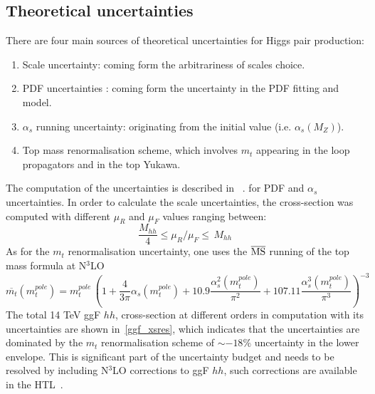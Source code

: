 \subsection{Theoretical uncertainties}
There are four main sources of theoretical uncertainties for Higgs pair production:
\begin{enumerate}
	\item Scale uncertainty: coming form the arbitrariness of scales choice.
	\item PDF uncertainties : coming form the uncertainty in the PDF fitting and model.
	\item $\alpha_s$ running uncertainty: originating from the initial value (i.e. $\alpha_s(M_Z) $).
	\item Top mass renormalisation scheme, which involves $m_t$ appearing in the loop propagators and in the top Yukawa.
\end{enumerate}
The computation of the uncertainties is described in ~\cite{Martin:2009bu, Demartin:2010er}. for PDF and $\alpha_s$ uncertainties.
In order to calculate the scale uncertainties, the cross-section was computed with different $ \mu_R$ and $\mu_F$ values ranging between:
\begin{equation}
	\frac{M_{hh}}{4} \leq \mu_R/\mu_F  \leq \,M_{hh}
\end{equation}
As for the $m_t$ renormalisation uncertainty, one uses the $\overline{\mathrm{MS}}$ running of the top mass formula at N$^3$LO~\cite{Baglio:2020wgt}
\begin{equation}
	\overline{m_t} (m_t^{pole}) =m_t^{pole}\, \left( 1+\frac{4}{3 \pi} \alpha_s(m_t^{pole})+10.9 \frac{\alpha^2_s(m_t^{pole})}{\pi^2} +107.11 \frac{\alpha^3_s(m_t^{pole})}{\pi^3} \right) ^{-3} 
\end{equation}
The total 14 TeV ggF $hh$, cross-section at different orders in computation with its uncertainties are shown in~\autoref{ggf_xsres}, which indicates that the uncertainties are dominated by the $m_t$ renormalisation scheme of $\sim -18\%$ uncertainty in the lower envelope.  This is significant part of the uncertainty budget and needs to be resolved by including N$^3$LO corrections to ggF $hh$, such corrections are available in the  HTL~\cite{Chen:2019lzz,Chen:2019fhs}. 
%
